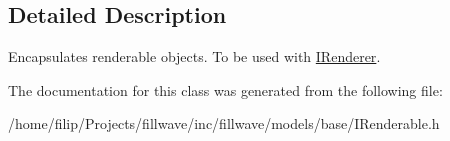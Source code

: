 \subsection{Detailed Description}
Encapsulates renderable objects. To be used with \hyperlink{classflw_1_1flf_1_1IRenderer}{I\+Renderer}. 

The documentation for this class was generated from the following file\+:\begin{DoxyCompactItemize}
\item 
/home/filip/\+Projects/fillwave/inc/fillwave/models/base/I\+Renderable.\+h\end{DoxyCompactItemize}

